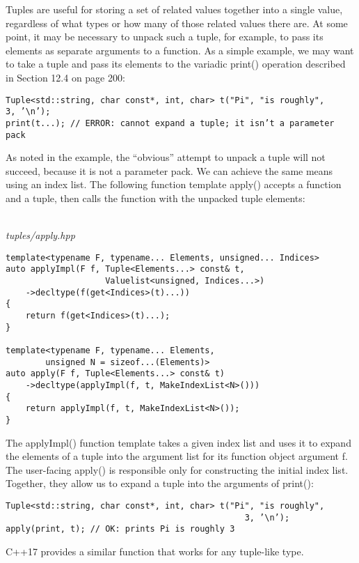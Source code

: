 Tuples are useful for storing a set of related values together into a single value, regardless of what types or how many of those related values there are. At some point, it may be necessary to unpack such a tuple, for example, to pass its elements as separate arguments to a function. As a simple example, we may want to take a tuple and pass its elements to the variadic print() operation described in Section 12.4 on page 200:

\begin{lstlisting}[style=styleCXX]
Tuple<std::string, char const*, int, char> t("Pi", "is roughly",
3, ’\n’);
print(t...); // ERROR: cannot expand a tuple; it isn’t a parameter pack
\end{lstlisting}

As noted in the example, the “obvious” attempt to unpack a tuple will not succeed, because it is not a parameter pack. We can achieve the same means using an index list. The following function template apply() accepts a function and a tuple, then calls the function with the unpacked tuple elements:

\hspace*{\fill} \\ %
\noindent
\textit{tuples/apply.hpp}
\begin{lstlisting}[style=styleCXX]
template<typename F, typename... Elements, unsigned... Indices>
auto applyImpl(F f, Tuple<Elements...> const& t,
					Valuelist<unsigned, Indices...>)
	->decltype(f(get<Indices>(t)...))
{
	return f(get<Indices>(t)...);
}

template<typename F, typename... Elements,
		unsigned N = sizeof...(Elements)>
auto apply(F f, Tuple<Elements...> const& t)
	->decltype(applyImpl(f, t, MakeIndexList<N>()))
{
	return applyImpl(f, t, MakeIndexList<N>());
}
\end{lstlisting}

The applyImpl() function template takes a given index list and uses it to expand the elements of a tuple into the argument list for its function object argument f. The user-facing apply() is responsible only for constructing the initial index list. Together, they allow us to expand a tuple into the arguments of print():

\begin{lstlisting}[style=styleCXX]
Tuple<std::string, char const*, int, char> t("Pi", "is roughly",
												3, ’\n’);
apply(print, t); // OK: prints Pi is roughly 3
\end{lstlisting}

C++17 provides a similar function that works for any tuple-like type.






































